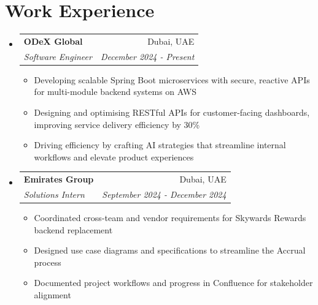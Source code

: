 \documentclass[a4paper,20pt]{article}
\makeatletter
\newcommand{\resumeItemWithoutTitle}[1] {
	\item\small{
		{#1 \vspace{-2pt}}
	}
}
\newcommand{\resumeSubheading}[4] {
	\vspace{-1pt}\item
	\begin{tabular*}{0.97\textwidth}{l@{\extracolsep{\fill}}r}
		\textbf{#1} & #2 \\
		\textit{#3} & \textit{#4} \\
	\end{tabular*}\vspace{-5pt}
}
\newcommand{\resumeSubHeadingListStart}{\begin{itemize}[leftmargin=*]}
\newcommand{\resumeSubHeadingListEnd}{\end{itemize}}
\newcommand{\resumeItemListStart}{\begin{itemize}}
\newcommand{\resumeItemListEnd}{\end{itemize}\vspace{-5pt}}
\makeatother
\begin{document}

\vspace{2pt}

\section{Work Experience}
	\resumeSubHeadingListStart
		\resumeSubheading{ODeX Global}{Dubai, UAE} {Software Engineer}{December 2024 - Present}
		\resumeItemListStart
			\resumeItemWithoutTitle{Developing scalable Spring Boot microservices with secure, reactive APIs for multi-module backend systems on AWS}
			\resumeItemWithoutTitle{Designing and optimising RESTful APIs for customer-facing  dashboards, improving service delivery efficiency by 30\%}
			\resumeItemWithoutTitle{Driving efficiency by crafting AI strategies that streamline internal workflows and elevate product experiences}
		\resumeItemListEnd
		\vspace{5pt}
		\resumeSubheading{Emirates Group}{Dubai, UAE} {Solutions Intern}{September 2024 - December 2024}
		\resumeItemListStart
			\resumeItemWithoutTitle{Coordinated cross-team and vendor requirements for Skywards Rewards backend replacement}
			\resumeItemWithoutTitle{Designed use case diagrams and specifications to streamline the Accrual process}
			\resumeItemWithoutTitle{Documented project workflows and progress in Confluence for stakeholder alignment}
		\resumeItemListEnd
		\vspace{5pt}
	\resumeSubHeadingListEnd
\vspace{-2pt}

\end{document}
